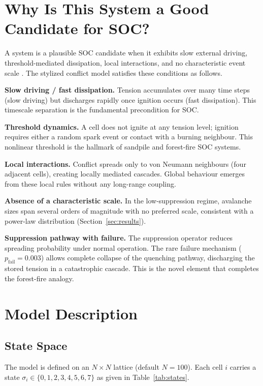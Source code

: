 \documentclass[12pt,a4paper]{article}
\begin{document}
\section{Why Is This System a Good Candidate for SOC?}

A system is a plausible SOC candidate when it exhibits slow external driving,
threshold-mediated dissipation, local interactions, and no characteristic event scale
\citep{jensen1998}. The stylized conflict model satisfies these conditions as follows.

\textbf{Slow driving / fast dissipation.}
Tension accumulates over many time steps (slow driving) but discharges rapidly once
ignition occurs (fast dissipation). This timescale separation is the fundamental
precondition for SOC.

\textbf{Threshold dynamics.}
A cell does not ignite at any tension level; ignition requires either a random spark
event or contact with a burning neighbour. This nonlinear threshold is the hallmark of
sandpile and forest-fire SOC systems.

\textbf{Local interactions.}
Conflict spreads only to von Neumann neighbours (four adjacent cells), creating locally
mediated cascades. Global behaviour emerges from these local rules without any
long-range coupling.

\textbf{Absence of a characteristic scale.}
In the low-suppression regime, avalanche sizes span several orders of magnitude with no
preferred scale, consistent with a power-law distribution (Section~\ref{sec:results}).

\textbf{Suppression pathway with failure.}
The suppression operator reduces spreading probability under normal operation. The rare
failure mechanism ($p_{\text{fail}} = 0.003$) allows complete collapse of the quenching
pathway, discharging the stored tension in a catastrophic cascade. This is the novel
element that completes the forest-fire analogy.

\section{Model Description}

\subsection{State Space}

The model is defined on an $N\times N$ lattice (default $N=100$). Each cell $i$ carries
a state $\sigma_i \in \{0,1,2,3,4,5,6,7\}$ as given in Table~\ref{tab:states}.
\end{document}
